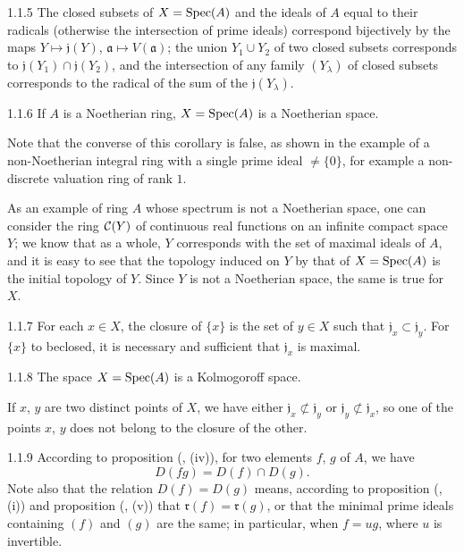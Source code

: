 \documentclass[../main.tex]{subfiles}
\begin{document}
\begin{env}[Corollary]{1.1.5}
The closed subsets of $X=\operatorname{Spec}(A)$ and the ideals of $A$ equal to their radicals (otherwise the
intersection of prime ideals) correspond bijectively by the  maps $Y\mapsto\mathfrak{j}(Y)$,
$\mathfrak{a}\mapsto V(\mathfrak{a})$; the union $Y_1\cup Y_2$ of two closed subsets corresponds to
$\mathfrak{j}(Y_1)\cap\mathfrak{j}(Y_2)$, and the intersection of any family $(Y_\lambda)$ of closed subsets
corresponds to the radical of the sum of the $\mathfrak{j}(Y_\lambda)$.
\end{env}

\begin{env}[Corollary]{1.1.6}
If $A$ is a Noetherian ring, $X=\operatorname{Spec}(A)$ is a Noetherian space.
\end{env}
Note that the converse of this corollary is false, as shown
in the example of a non-Noetherian integral ring with a single prime ideal $\neq\{0\}$, for
example a non-discrete valuation ring of rank $1$.

As an example of ring $A$ whose spectrum is not a Noetherian space, one
can consider the ring $\mathcal{C}(Y)$ of continuous real functions on an infinite compact space
$Y$; we know that as a whole, $Y$ corresponds with the set of maximal ideals
of $A$, and it is easy to see that the topology induced on $Y$ by that of $X=\operatorname{Spec}(A)$
is the initial topology of $Y$. Since $Y$ is not a Noetherian space, the same is true for $X$.

\begin{env}[Corollary]{1.1.7}
For each $x\in X$, the closure of $\{x\}$ is the set of $y\in X$ such that $\mathfrak{j}_x\subset\mathfrak{j}_y$.
For $\{x\}$ to beclosed, it is necessary and sufficient that $\mathfrak{j}_x$ is maximal.
\end{env}

\begin{env}[Corollary]{1.1.8}
The space $X=\operatorname{Spec}(A)$ is a Kolmogoroff space.
\end{env}

If $x$, $y$ are two distinct points of $X$, we have either $\mathfrak{j}_x\not\subset\mathfrak{j}_y$ or
$\mathfrak{j}_y\not\subset\mathfrak{j}_x$, so one of the points $x$, $y$ does not belong to the closure of the other.

\begin{env}{1.1.9}
According to proposition (, (iv)), for two elements $f$, $g$ of $A$, we have
\[
  D(fg)=D(f)\cap D(g).\tag{1.1.9.1}
\]
Note also that the relation $D(f)=D(g)$ means, according to proposition (, (i))
and proposition (, (v)) that $\mathfrak{r}(f)=\mathfrak{r}(g)$, or that the minimal prime ideals
containing $(f)$ and $(g)$ are the same; in particular, when $f=ug$, where $u$ is invertible.
\end{env}
\end{document}
